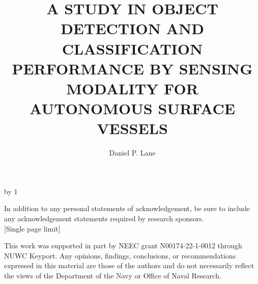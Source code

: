 \documentclass{erauthesis}
\title{A STUDY IN OBJECT DETECTION AND CLASSIFICATION
PERFORMANCE BY SENSING MODALITY FOR AUTONOMOUS
SURFACE VESSELS} %
\author{Daniel P. Lane}
\begin{document}
\frontmatter

\maketitle

\makeatletter 
\advance\fau@frontstage by 1  %


\begin{acknowledgements}

    \raggedright In addition to any personal statements of acknowledgement, be sure to include any acknowledgement statements required by research sponsors.\\{[Single page limit]} 

    \raggedright This work was supported in part by NEEC
grant N00174-22-1-0012 through NUWC Keyport.
Any opinions, findings, conclusions, or recommendations expressed in this material are those of the authors and do not necessarily reflect the views of the Department of the Navy or Office of Naval Research.
\end{acknowledgements}
\end{document}
